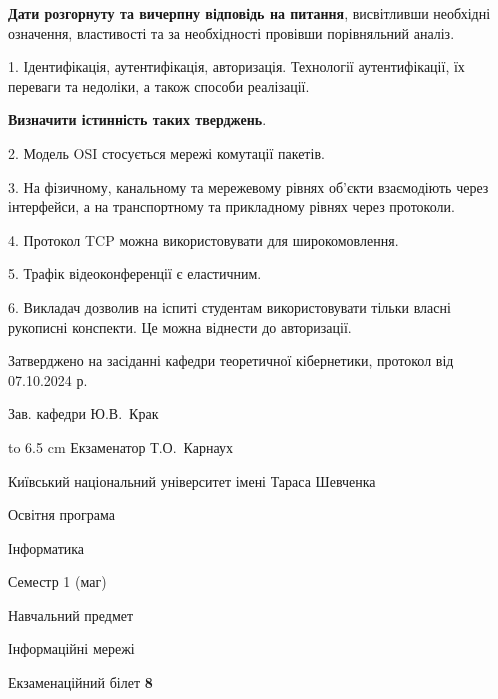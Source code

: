 \documentclass[12pt, ukrainian]{article}
\begin{document}
{
\qquad\textbf{Дати розгорнуту та вичерпну відповідь на питання}, висвітливши необхідні означення, властивості та за необхідності провівши порівняльний аналіз.

1. Ідентифікація, аутентифікація, авторизація. Технології аутентифікації, їх переваги та недоліки, а також способи реалізації.



\qquad\textbf{Визначити істинність таких тверджень}.

2. Модель OSI стосується мережі комутації пакетів.


3. На фізичному, канальному та мережевому рівнях об'єкти взаємодіють через інтерфейси, а на транспортному та прикладному рівнях через протоколи.


4. Протокол TCP можна використовувати для широкомовлення.


5. Трафік відеоконференції є еластичним.


6. Викладач дозволив на іспиті студентам використовувати тільки власні рукописні конспекти. Це можна віднести до авторизації.

}
{\smallskip\smallskip \begin {scriptsize} Затверджено на засіданні кафедри теоретичної кібернетики, протокол   від   07.10.2024 р.\par\smallskip\smallskip\smallskip\smallskip
{\parbox {6.5 cm} {Зав. кафедри \dotfill Ю.В.~Крак}}\hspace {0.7cm} {\hbox to 6.5 cm { Екзаменатор \dotfill Т.О.~Карнаух}} \end{scriptsize}}
\vspace{0.9cm}
{{\begin {scriptsize}\par
{ \center  Київський національний університет імені Тараса Шевченка \par}
{\parbox {5 cm}{Освітня програма \hfill}{\parbox {7 cm}{Інформатика\hfill}}\parbox {6 cm}{\hfill Семестр 1 (маг)}}\par
{\parbox {5 cm} {Навчальний предмет \hfill}\parbox {7 cm}{Інформаційні мережі \hfill}\parbox {6cm}{\hfill}\par}\vspace{-15pt} \end{scriptsize}}{\center Екзаменаційний білет \No \textbf { 8 }\par}}
\end{document}
